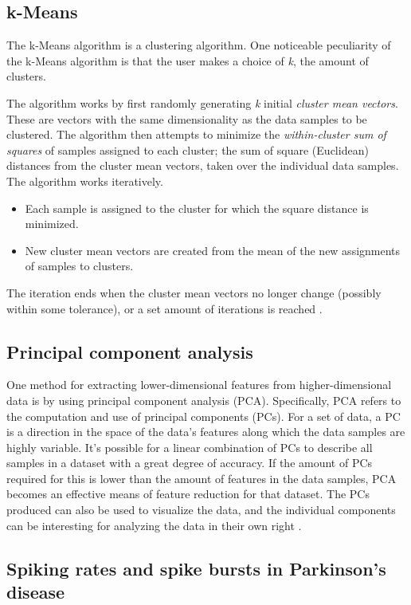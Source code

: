 \documentclass{article}
\begin{document}
\subsection{k-Means}\label{KM BG}

The k-Means algorithm is a clustering algorithm. 
One noticeable peculiarity of the k-Means algorithm is that the user makes a choice of \textit{k}, the amount of clusters. 

The algorithm works by first randomly generating \textit{k} initial \textit{cluster mean vectors}. 
These are vectors with the same dimensionality as the data samples to be clustered. 
The algorithm then attempts to minimize the \textit{within-cluster sum of squares} of samples assigned to each cluster; the sum of square (Euclidean) distances from the cluster mean vectors, taken over the individual data samples.
The algorithm works iteratively. 
\begin{itemize}
    \item Each sample is assigned to the cluster for which the square distance is minimized.
    \item New cluster mean vectors are created from the mean of the new assignments of samples to clusters.
\end{itemize}
The iteration ends when the cluster mean vectors no longer change (possibly within some tolerance), or a set amount of iterations is reached \citep[p258-260]{PractStats}.

\subsection{Principal component analysis}\label{PCA BG}

One method for extracting lower-dimensional features from higher-dimensional data is by using principal component analysis (PCA).
Specifically, PCA refers to the computation and use of principal components (PCs).
For a set of data, a PC is a direction in the space of the data's features along which the data samples are highly variable.
It's possible for a linear combination of PCs to describe all samples in a dataset with a great degree of accuracy.
If the amount of PCs required for this is lower than the amount of features in the data samples, PCA becomes an effective means of feature reduction for that dataset.
The PCs produced can also be used to visualize the data, and the individual components can be interesting for analyzing the data in their own right \citep[p374-380]{ISLR}.

\subsection{Spiking rates and spike bursts in Parkinson's disease}\label{BG SpikeRates}
\end{document}
